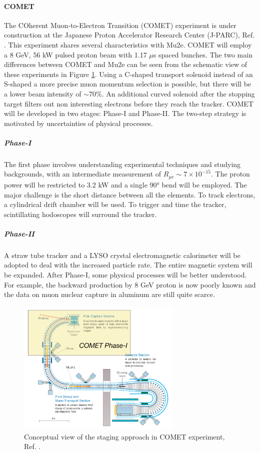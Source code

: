 \paragraph{COMET}
The COherent Muon-to-Electron Transition (COMET) experiment is under construction at
the Japanese Proton Accelerator Research Center (J-PARC), Ref. \cite{Abramishvili_2020}. 
This experiment shares several characteristics with Mu2e. COMET will employ a 8 GeV, 56 kW pulsed proton beam
with 1.17 $\mu$s spaced bunches. The two main differences between
COMET and Mu2e can be seen from the schematic view of these experiments in Figure \ref{fig:comet}.
Using a C-shaped transport solenoid instead of an S-shaped a more precise muon momentum selection 
is possible, but there will be a lower beam intensity of $\sim$70\%.
An additional curved solenoid after the stopping target filters out non 
interesting electrons before they reach the tracker.
COMET will be developed in two stages: Phase-I and Phase-II. The two-step strategy is motivated by uncertainties of physical processes. 
\subparagraph*{Phase-I} The first phase involves understanding experimental techniques and studying backgrounds, 
with an intermediate measurement of $R_{\mu e} \sim 7\times 10^{-15}$. The proton power will be restricted to 
3.2 kW and a single 90° bend will be employed. The major challenge is the short distance between all the elements. 
To track electrons, a cylindrical drift chamber will be used. To trigger and time the tracker, 
scintillating hodoscopes will surround the tracker. 
\subparagraph*{Phase-II} A straw tube tracker and a LYSO crystal electromagnetic 
calorimeter will be adopted to deal with the increased particle rate. 
The entire magnetic system will be  expanded.
After Phase-I, some physical processes will be better understood.
For example, the backward production by 8 GeV proton is now poorly known and the data on muon nuclear
capture in aluminum are still quite scarce. 
\begin{figure}[!h]
\centering
\includegraphics[width =0.7\textwidth]{figures/png/Screenshot_20240307_152133.png}
\caption{Conceptual view of the staging approach in COMET experiment, Ref. \cite{Abramishvili_2020}.}
\label{fig:comet}
\end{figure}
